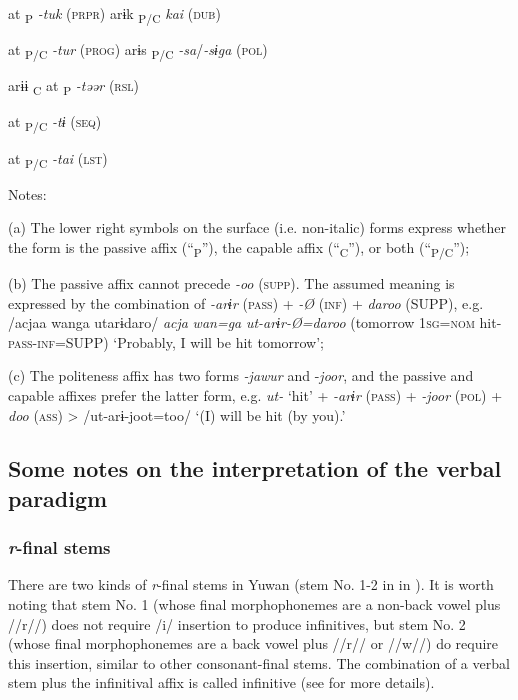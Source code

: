 \begin{table}
    at\textsubscript{ P}  \textit{-tuk} (\textsc{prpr})    arɨk\textsubscript{ P/C}      \textit{kai}  (\textsc{dub})

    at\textsubscript{ P/C}  \textit{-tur} (\textsc{prog})    arɨs\textsubscript{ P/C}      \textit{-sa}/\textit{-sɨga}  (\textsc{pol})

  arɨɨ\textsubscript{ C}  at\textsubscript{ P}  \textit{-təər} (\textsc{rsl})

    at\textsubscript{ P/C}  \textit{-tɨ} (\textsc{seq})

    at\textsubscript{ P/C}  \textit{-tai} (\textsc{lst})

Notes:

(a) The lower right symbols on the surface (i.e. non-italic) forms express whether the form is the passive affix (“\textsubscript{P}”), the capable affix (“\textsubscript{C}”), or both (“\textsubscript{P/C}”);

(b) The passive affix cannot precede \textit{-oo} (\textsc{supp}). The assumed meaning is expressed by the combination of \textit{-arɨr} (\textsc{pass}) + \textit{-Ø} (\textsc{inf}) + \textit{daroo} (SUPP), e.g. /acjaa wanga utarɨdaro/ \textit{acja} \textit{wan=ga} \textit{ut-arɨr-Ø=daroo} (tomorrow 1\textsc{sg}=\textsc{nom} hit-\textsc{pass}-\textsc{inf}=SUPP) ‘Probably, I will be hit tomorrow’;

(c) The politeness affix has two forms \textit{-jawur} and -\textit{joor}, and the passive and capable affixes prefer the latter form, e.g. \textit{ut-} ‘hit’ + \textit{-arɨr} (\textsc{pass}) + \textit{-joor} (\textsc{pol}) + \textit{doo} (\textsc{ass}) > /ut-arɨ-joot=too/ ‘(I) will be hit (by you).’
\end{table}

\subsection{Some notes on the interpretation of the verbal paradigm}
\subsubsection{\textit{r}-final stems}

There are two kinds of \textit{r}-final stems in Yuwan (stem No. 1-2 in  in ). It is worth noting that stem No. 1 (whose final morphophonemes are a non-back vowel plus //r//) does not require /i/ insertion to produce infinitives, but stem No. 2 (whose final morphophonemes are a back vowel plus //r// or //w//) do require this insertion, similar to other consonant-final stems. The combination of a verbal stem plus the infinitival affix is called infinitive (see  for more details).

